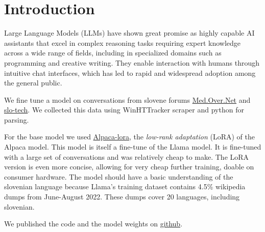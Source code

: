 \documentclass[fleqn,moreauthors,10pt]{ds_report}
\affiliation{\textit{Advisors: Slavko Žitnik}}
\begin{document}
\flushbottom 

\maketitle 

\thispagestyle{empty} 


\section*{Introduction}
Large Language Models (LLMs) have shown great promise as highly capable AI assistants that excel in complex reasoning tasks requiring expert knowledge across a wide range of fields, including in specialized domains such as programming and creative writing. They enable interaction with humans through intuitive chat interfaces, which has led to rapid and widespread adoption among the general public.

We fine tune a model on conversations from slovene forums \href{https://forum.over.net/forum/}{Med.Over.Net} and \href{www.slo-tech.com}{slo-tech}. We collected this data using WinHTTracker scraper and python for parsing.

For the base model we used \href{https://github.com/tloen/alpaca-lora}{Alpaca-lora}, the \emph{low-rank adaptation} (LoRA)\cite{hu2021lowrank} of the Alpaca\cite{Bommasani2021FoundationModels} model. This model is itself a fine-tune of the Llama\cite{touvron2023llama} model. It is fine-tuned with a large set of conversations and was relatively cheap to make. The LoRA version is even more concise, allowing for very cheap further training, doable on consumer hardware.
The model should have a basic understanding of the slovenian language because Llama's training dataset contains 4.5\% wikipedia dumps from June-August 2022. These dumps cover 20 languages, including slovenian.

We published the code and the model weights on \href{https://github.com/UL-FRI-NLP-2023-2024/ul-fri-nlp-course-project-tree-pipit/}{github}.

\end{document}
